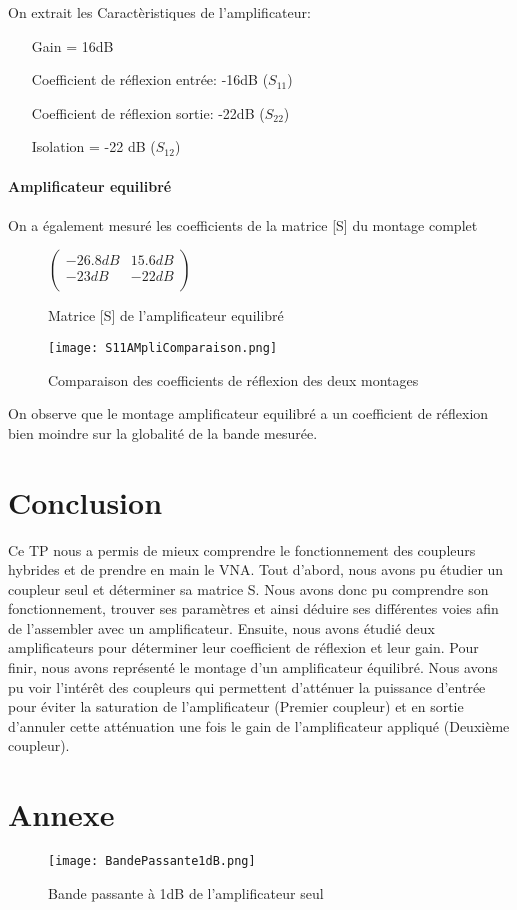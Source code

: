 \documentclass[oneside,a4paper,12pt]{article}
\begin{document}
	On extrait les Caractèristiques de l'amplificateur:
	\begin{itemize}
		\item[Gain] = 16dB
		\item[Coefficient de réflexion] entrée: -16dB ($S_{11}$)
		\item[Coefficient de réflexion] sortie: -22dB ($S_{22}$)
		\item[Isolation] = -22 dB ($S_{12}$)  
	\end{itemize}

	\paragraph{Amplificateur equilibré} \paragraph{}

	On a également mesuré les coefficients de la matrice [S] du montage complet
	
	\begin{figure}[h]
		\centering
		$
		\begin{pmatrix}
			-26.8 dB & 15.6 dB \\
			-23 dB & -22 dB \\
		\end{pmatrix}
		$
		\caption{Matrice [S] de l'amplificateur equilibré}
	\end{figure}

	\newpage
	\begin{figure}[h]
		\centering
		\texttt{[image: S11AMpliComparaison.png]}
		\caption{Comparaison des coefficients de réflexion des deux montages}
	\end{figure}

	On observe que le montage amplificateur equilibré a un coefficient de réflexion bien moindre sur la globalité de la bande mesurée.

	\newpage
	\section{Conclusion}
	Ce TP nous a permis de mieux comprendre le fonctionnement des coupleurs hybrides et de prendre en main le VNA. 
	Tout d’abord, nous avons pu étudier un coupleur seul et déterminer sa matrice S. 
	Nous avons donc pu comprendre son fonctionnement, trouver ses paramètres et ainsi déduire ses différentes voies afin de l’assembler avec un amplificateur. 
	Ensuite, nous avons étudié deux amplificateurs pour déterminer leur coefficient de réflexion et leur gain. 
	Pour finir, nous avons représenté le montage d’un amplificateur équilibré. 
	Nous avons pu voir l’intérêt des coupleurs qui permettent d’atténuer la puissance 
	d’entrée pour éviter la saturation de l’amplificateur (Premier coupleur) et en sortie d’annuler cette atténuation une fois le gain de l’amplificateur appliqué (Deuxième coupleur).
	
	\newpage
	\appendix
	\section{Annexe}

	\begin{figure}[h]
		\centering
		\texttt{[image: BandePassante1dB.png]}
		\caption{Bande passante à 1dB de l'amplificateur seul}
	\end{figure}
\end{document}
